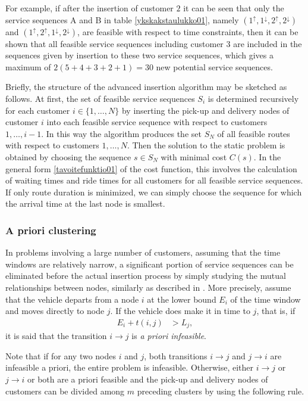 \documentclass[dissertation,draft*]{aaltoseries}
\begin{document}
For example, if after the insertion of customer $2$ it can be seen that only the
service sequences A and B in table \ref{ykskakstaulukko01}, namely 
$( 1^{\uparrow}, 1^{\downarrow}, 2^{\uparrow}, 2^{\downarrow})$ and $( 1^{\uparrow}, 2^{\uparrow}, 1^{\downarrow}, 2^{\downarrow})$,
are feasible with respect to time constraints, then it can be
shown that all feasible service sequences including customer $3$ are included in
the sequences given by insertion to these two service sequences, which gives
a maximum of $2(5+4+3+2+1) = 30$ new potential service sequences.

Briefly, the structure of the advanced insertion algorithm may be sketched as follows.
At first, the set of feasible service sequences $S_i$ is determined recursively
for each customer $i \in \{1, \ldots, N\}$ by inserting the pick-up and delivery nodes of customer $i$ into each feasible
service sequence with respect to customers $1,\ldots,i-1$. In this way the algorithm 
produces the set $S_N$ of all feasible routes with respect to customers $1,\ldots,N$. 
Then the solution to the static problem is obtained by choosing the sequence $s \in S_N$ with
minimal cost $C(s)$. In the general form \eqref{tavoitefunktio01} of the cost function, this involves
the calculation of waiting times and ride times for all customers
for all feasible service sequences. If only route duration is minimized,
we can simply choose the sequence for which the arrival time at the last
node is smallest.


\subsubsection{A priori clustering}
\label{clustering}
In problems involving a large number of customers, assuming that the time windows are relatively narrow,
a significant portion of service sequences can be eliminated before 
the actual insertion process by simply studying the mutual relationships between nodes, similarly 
as described in \cite{dumas03}.
More precisely, assume that the vehicle departs from a node $i$ at the lower
bound $E_i$ of the time window and moves directly to node $j$. If the vehicle 
does make it in time to $j$, that is, if
	\begin{align}
		E_{i} + t(i,j) & > L_{j},
	\end{align}
it is said that the transition $i\to j$ is \emph{a priori infeasible}.

Note that if for any two nodes $i$ and $j$, both transitions $i \to j$ and 
$j \to i$ are infeasible a priori, the entire problem is infeasible. 
Otherwise, either $i \to j$ or $j \to i$ or both are a priori feasible and the pick-up and delivery nodes of customers
can be divided among $m$ preceding clusters by using the following rule.
\end{document}
